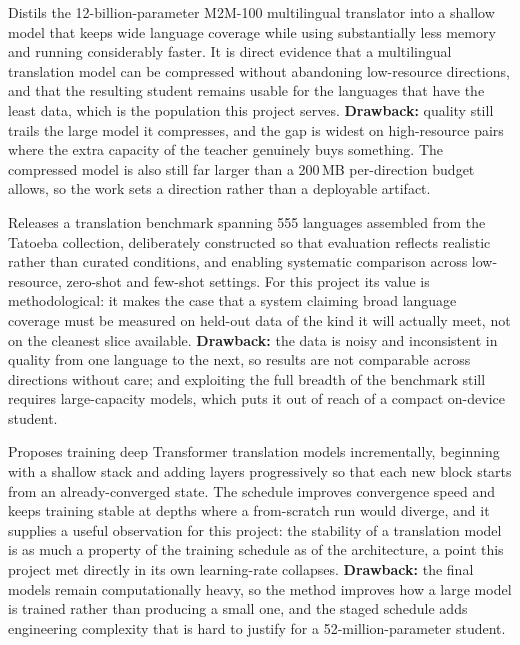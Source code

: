 Distils the 12-billion-parameter M2M-100 multilingual translator into a
shallow model that keeps wide language coverage while using substantially less
memory and running considerably faster. It is direct evidence that a
multilingual translation model can be compressed without abandoning
low-resource directions, and that the resulting student remains usable for the
languages that have the least data, which is the population this project
serves. \textbf{Drawback:} quality still trails the large model it compresses,
and the gap is widest on high-resource pairs where the extra capacity of the
teacher genuinely buys something. The compressed model is also still far larger
than a 200\,MB per-direction budget allows, so the work sets a direction rather
than a deployable artifact.

Releases a translation benchmark spanning 555 languages assembled from the
Tatoeba collection, deliberately constructed so that evaluation reflects
realistic rather than curated conditions, and enabling systematic comparison
across low-resource, zero-shot and few-shot settings. For this project its
value is methodological: it makes the case that a system claiming broad
language coverage must be measured on held-out data of the kind it will
actually meet, not on the cleanest slice available.
\textbf{Drawback:} the data is noisy and inconsistent in quality from one
language to the next, so results are not comparable across directions without
care; and exploiting the full breadth of the benchmark still requires
large-capacity models, which puts it out of reach of a compact on-device
student.

Proposes training deep Transformer translation models incrementally,
beginning with a shallow stack and adding layers progressively so that each new
block starts from an already-converged state. The schedule improves convergence
speed and keeps training stable at depths where a from-scratch run would
diverge, and it supplies a useful observation for this project: the stability of
a translation model is as much a property of the training schedule as of the
architecture, a point this project met directly in its own learning-rate
collapses. \textbf{Drawback:} the final models remain computationally heavy, so
the method improves how a large model is trained rather than producing a small
one, and the staged schedule adds engineering complexity that is hard to
justify for a 52-million-parameter student.

